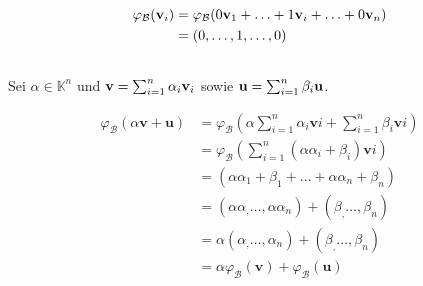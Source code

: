 \documentclass{../mfa}
\begin{document}
\maketitle
\renewcommand{\v}[1]{\mbf{v}_{#1}}

\section{}

\subsection{}
\begin{align*}
   \varphi_\mathcal{B}(\v{i}) & = \varphi_\mathcal{B}(0\v{1} + \ldots + 1\v{i} + \ldots + 0\v{n}) \\
                        & = (0,\ldots, 1, \ldots, 0)
\end{align*}

\subsection{}

Sei $\alpha \in \mathbb{K}^n$ und $\mbf{v} = \sum_{i=1}^n \alpha_i \v{i}$ sowie $\mathbf{u} = \sum_{i=1}^n \beta_i \mathbf{u}$.

\newcommand{\myphi}[1]{\varphi_\mathcal{B}\left(#1\right)}
{
   \renewcommand{\v}{\mathbf{v}}
   \renewcommand{\u}{\mathbf{u}}
   \begin{align*}
      \myphi{\alpha\v + \u} & = \myphi{\alpha\sum_{i=1}^n \alpha_i \v{i} + \sum_{i=1}^n \beta_i \v{i}} \\
                            & = \myphi{\sum_{i=1}^n (\alpha\alpha_i + \beta_i)\v{i}} \\
                            & = (\alpha\alpha_1 + \beta_1 + \ldots + \alpha\alpha_n + \beta_n) \\
                            & = (\alpha\alpha_, \ldots, \alpha\alpha_n) + (\beta_, \ldots, \beta_n) \\
                            & = \alpha(\alpha_, \ldots, \alpha_n) + (\beta_, \ldots, \beta_n) \\
                            & = \alpha\myphi{\v} + \myphi{\u}
   \end{align*}
}

\subsection{}
\end{document}
